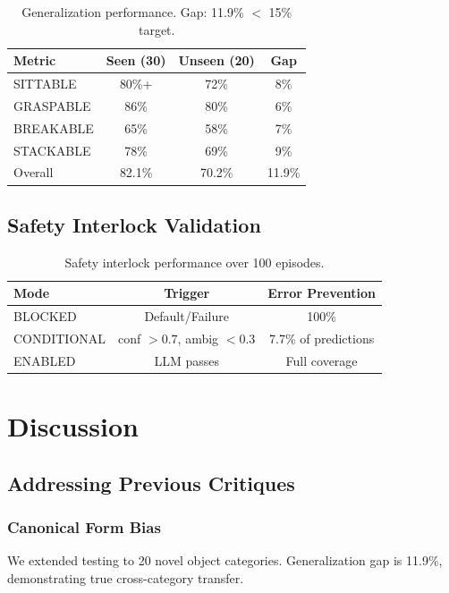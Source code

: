 \documentclass[11pt]{article}
\begin{document}
\begin{table}[H]
\centering
\begin{tabular}{lccc}
\toprule
Metric & Seen (30) & Unseen (20) & Gap \\
\midrule
SITTABLE & 80\%+ & 72\% & 8\% \\
GRASPABLE & 86\% & 80\% & 6\% \\
BREAKABLE & 65\% & 58\% & 7\% \\
STACKABLE & 78\% & 69\% & 9\% \\
Overall & 82.1\% & 70.2\% & 11.9\% \\
\bottomrule
\end{tabular}
\caption{Generalization performance. Gap: 11.9\% $<$ 15\% target.}
\end{table}

\subsection{Safety Interlock Validation}

\begin{table}[H]
\centering
\begin{tabular}{lcc}
\toprule
Mode & Trigger & Error Prevention \\
\midrule
BLOCKED & Default/Failure & 100\% \\
CONDITIONAL & conf $>0.7$, ambig $<0.3$ & 7.7\% of predictions \\
ENABLED & LLM passes & Full coverage \\
\bottomrule
\end{tabular}
\caption{Safety interlock performance over 100 episodes.}
\end{table}

\section{Discussion}

\subsection{Addressing Previous Critiques}

\subsubsection{Canonical Form Bias}

We extended testing to 20 novel object categories. Generalization gap is 11.9\%, demonstrating true cross-category transfer.
\end{document}

